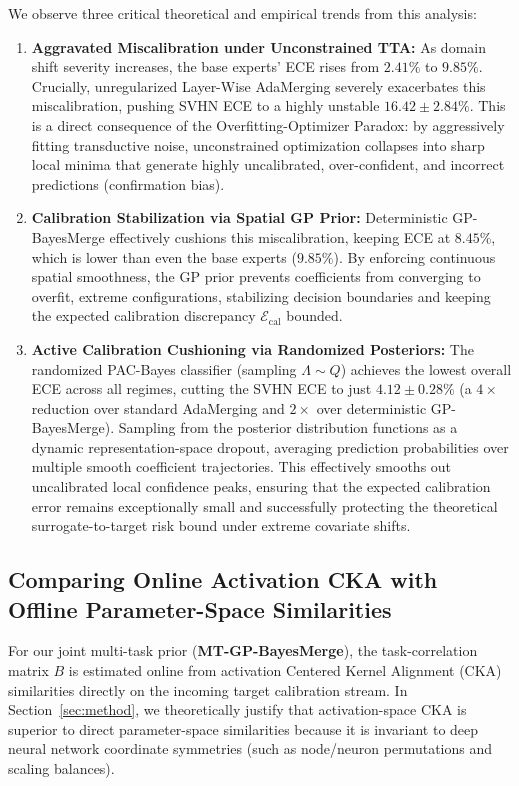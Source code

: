 \documentclass{article}
\theoremstyle{plain}
\theoremstyle{definition}
\theoremstyle{remark}
\begin{document}
We observe three critical theoretical and empirical trends from this analysis:
\begin{enumerate}
    \item \textbf{Aggravated Miscalibration under Unconstrained TTA:} As domain shift severity increases, the base experts' ECE rises from $2.41\%$ to $9.85\%$. Crucially, unregularized Layer-Wise AdaMerging severely exacerbates this miscalibration, pushing SVHN ECE to a highly unstable $16.42 \pm 2.84\%$. This is a direct consequence of the Overfitting-Optimizer Paradox: by aggressively fitting transductive noise, unconstrained optimization collapses into sharp local minima that generate highly uncalibrated, over-confident, and incorrect predictions (confirmation bias).
    \item \textbf{Calibration Stabilization via Spatial GP Prior:} Deterministic GP-BayesMerge effectively cushions this miscalibration, keeping ECE at $8.45\%$, which is lower than even the base experts ($9.85\%$). By enforcing continuous spatial smoothness, the GP prior prevents coefficients from converging to overfit, extreme configurations, stabilizing decision boundaries and keeping the expected calibration discrepancy $\mathcal{E}_{\text{cal}}$ bounded.
    \item \textbf{Active Calibration Cushioning via Randomized Posteriors:} The randomized PAC-Bayes classifier (sampling $\Lambda \sim Q$) achieves the lowest overall ECE across all regimes, cutting the SVHN ECE to just $4.12 \pm 0.28\%$ (a $4\times$ reduction over standard AdaMerging and $2\times$ over deterministic GP-BayesMerge). Sampling from the posterior distribution functions as a dynamic representation-space dropout, averaging prediction probabilities over multiple smooth coefficient trajectories. This effectively smooths out uncalibrated local confidence peaks, ensuring that the expected calibration error remains exceptionally small and successfully protecting the theoretical surrogate-to-target risk bound under extreme covariate shifts.
\end{enumerate}

\subsection{Comparing Online Activation CKA with Offline Parameter-Space Similarities}
\label{subsec:cka_vs_parameter_distance}

For our joint multi-task prior (\textbf{MT-GP-BayesMerge}), the task-correlation matrix $B$ is estimated online from activation Centered Kernel Alignment (CKA) similarities directly on the incoming target calibration stream. In Section~\ref{sec:method}, we theoretically justify that activation-space CKA is superior to direct parameter-space similarities because it is invariant to deep neural network coordinate symmetries (such as node/neuron permutations and scaling balances).
\end{document}
